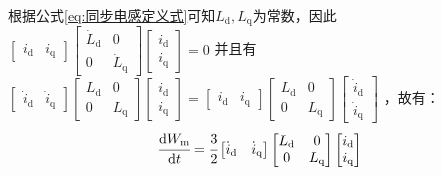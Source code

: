 根据公式\eqref{eq:同步电感定义式}可知\(L_{\mathrm{d}},L_{\mathrm{q}}\)为常数，因此
\(
\begin{bmatrix}{i}_{\mathrm{d}}&{i}_{\mathrm{q}}\end{bmatrix}
\begin{bmatrix}\dot{L}_{\mathrm{d}}&0\\0&\dot{L}_{\mathrm{q}}\end{bmatrix}
\begin{bmatrix}i_{\mathrm{d}}\\i_{\mathrm{q}}\end{bmatrix}=0
\)
并且有
\(\begin{bmatrix}\dot{i}_{\mathrm{d}}&\dot{i}_{\mathrm{q}}\end{bmatrix}
\begin{bmatrix}L_{\mathrm{d}}&0\\0&L_{\mathrm{q}}\end{bmatrix}
\begin{bmatrix}i_{\mathrm{d}}\\i_{\mathrm{q}}\end{bmatrix}=
\begin{bmatrix}i_{\mathrm{d}}&i_{\mathrm{q}}\end{bmatrix}
\begin{bmatrix}L_{\mathrm{d}}&0\\0&L_{\mathrm{q}}\end{bmatrix}
\begin{bmatrix}\dot{i}_{\mathrm{d}}\\\dot{i}_{\mathrm{q}}\end{bmatrix}
\)
，故有：
\begin{equation*}
\cfrac{\mathrm{d} W_{\mathrm{m}}}{\mathrm{d} t}=\cfrac32\begin{bmatrix}\dot{i}_{\mathrm{d}}&\dot{i}_{\mathrm{q}}\end{bmatrix}
\begin{bmatrix}L_{\mathrm{d}}&0\\0&L_{\mathrm{q}}\end{bmatrix}
\begin{bmatrix}i_{\mathrm{d}}\\i_{\mathrm{q}}\end{bmatrix}
\end{equation*}

